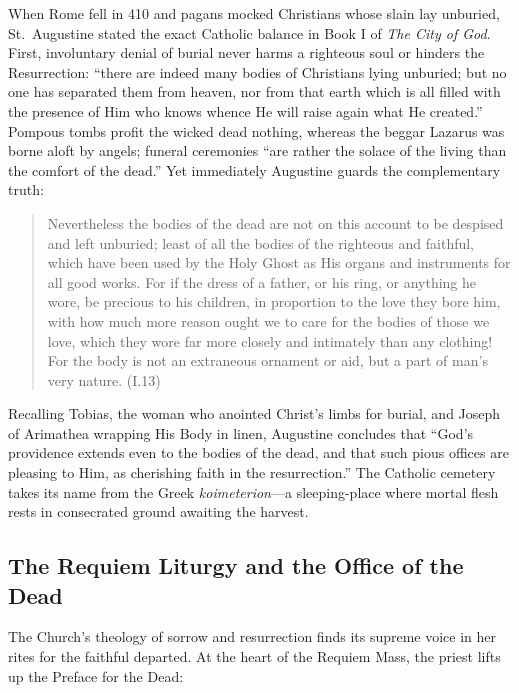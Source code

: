When Rome fell in 410 and pagans mocked Christians whose slain lay unburied, St.\ Augustine stated the exact Catholic balance in Book I of \emph{The City of God}. First, involuntary denial of burial never harms a righteous soul or hinders the Resurrection: ``there are indeed many bodies of Christians lying unburied; but no one has separated them from heaven, nor from that earth which is all filled with the presence of Him who knows whence He will raise again what He created.'' Pompous tombs profit the wicked dead nothing, whereas the beggar Lazarus was borne aloft by angels; funeral ceremonies ``are rather the solace of the living than the comfort of the dead.'' Yet immediately Augustine guards the complementary truth:

\begin{quote}
Nevertheless the bodies of the dead are not on this account to be despised and left unburied; least of all the bodies of the righteous and faithful, which have been used by the Holy Ghost as His organs and instruments for all good works. For if the dress of a father, or his ring, or anything he wore, be precious to his children, in proportion to the love they bore him, with how much more reason ought we to care for the bodies of those we love, which they wore far more closely and intimately than any clothing! For the body is not an extraneous ornament or aid, but a part of man's very nature. (I.13)
\end{quote}

Recalling Tobias, the woman who anointed Christ's limbs for burial, and Joseph of Arimathea wrapping His Body in linen, Augustine concludes that ``God's providence extends even to the bodies of the dead, and that such pious offices are pleasing to Him, as cherishing faith in the resurrection.'' The Catholic cemetery takes its name from the Greek \emph{koimeterion}---a sleeping-place where mortal flesh rests in consecrated ground awaiting the harvest.

\subsection{The Requiem Liturgy and the Office of the Dead}

The Church's theology of sorrow and resurrection finds its supreme voice in her rites for the faithful departed. At the heart of the Requiem Mass, the priest lifts up the Preface for the Dead:

